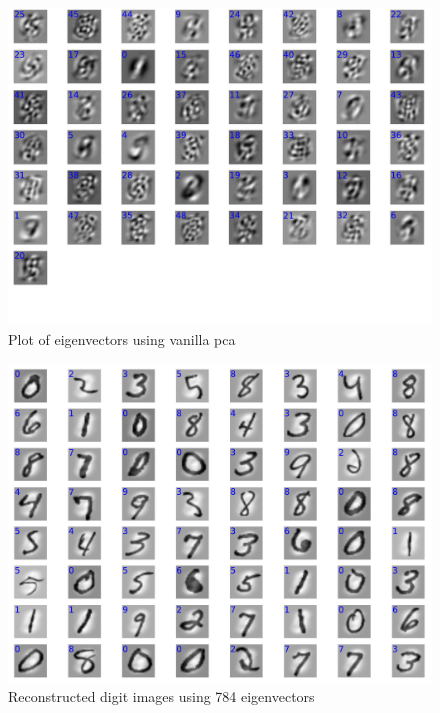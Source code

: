 \documentclass[a4paper,11pt]{article}
\begin{document}
\begin{figure}[!ht]
  \begin{center}
  \includegraphics[width=4.5in]{WU3_a.pdf}
  \caption{Plot of eigenvectors using vanilla pca}
  \label{figures:WU3a}
  \end{center}
\end{figure}

\begin{figure}[!ht]
  \begin{center}
  \includegraphics[width=4.5in]{WU3_b.pdf}
  \caption{Reconstructed digit images using 784 eigenvectors}
  \label{figures:WU3b}
  \end{center}
\end{figure}
\end{document}
